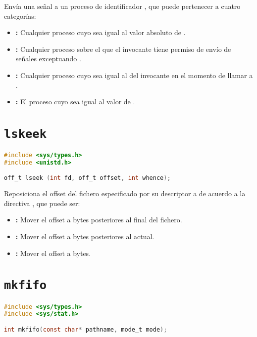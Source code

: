 Envía una señal  a un proceso de identificador , que puede pertenecer a cuatro categorías:

\begin{itemize}
	\item{}\textbf{:} Cualquier proceso cuyo  sea igual al valor absoluto de .
	\item{}\textbf{:} Cualquier proceso sobre el que el invocante tiene permiso de envío de señales exceptuando .
	\item{}\textbf{:} Cualquier proceso cuyo  sea igual al del invocante en el momento de llamar a .
	\item{}\textbf{:} El proceso cuyo  sea igual al valor de .
\end{itemize}

\section{\texttt{lskeek}}\label{lseek}

\begin{lstlisting}[language=C]
#include <sys/types.h>
#include <unistd.h>

off_t lseek (int fd, off_t offset, int whence);
\end{lstlisting}

Reposiciona el offset del fichero especificado por su descriptor  a  de acuerdo a la directiva , que puede ser:

\begin{itemize}
	\item{}\textbf{:} Mover el offset a  bytes posteriores al final del fichero.
	\item{}\textbf{:} Mover el offset a  bytes posteriores al actual.
	\item{}\textbf{:} Mover el offset a  bytes.
\end{itemize}

\section{\texttt{mkfifo}}\label{mkfifo}

\begin{lstlisting}[language=C]
#include <sys/types.h>
#include <sys/stat.h>

int mkfifo(const char* pathname, mode_t mode);
\end{lstlisting}

